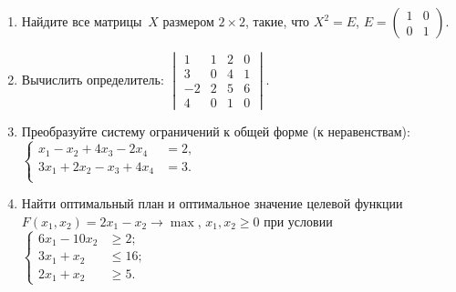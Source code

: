 \documentclass[a5paper,10pt]{extarticle}
\begin{document}
\begin{enumerate}
\item 
	Найдите все матрицы~$X$ размером $2\times 2$, такие, что 
	$X^2=E$,\quad 
	$E=\begin{pmatrix}
		1 & 0\\
		0 & 1
	\end{pmatrix}.
	$	
	\item Вычислить определитель: 
		$\begin{vmatrix}
				1  & 1  & 2  & 0  \\
				3  & 0  & 4  & 1  \\
			 -2  & 2  & 5  & 6  \\
				4  & 0  & 1  & 0
			\end{vmatrix}$.


\item Преобразуйте систему ограничений к общей форме (к неравенствам): 
$
\left\lbrace
\begin{aligned}
  x_1-x_2+4x_3-2x_4&=2,\\
  3x_1+2x_2-x_3+4x_4&=3.\\
\end{aligned}
\right.
$

  \item Найти оптимальный план и оптимальное значение целевой функции
		$F(x_{1},x_{2})=2x_{1}-x_{2} \to \max$, $x_{1},x_{2}\geqslant 0$
		при условии
 $
  \left\lbrace \begin{aligned}
    6x_{1}-10x_{2}	 &\geqslant	2;\\
    3x_{1}+	x_{2}	&\leqslant 16;\\
    2x_{1}	+x_{2} &\geqslant	5.
  \end{aligned} \right.
 $  

 
\end{enumerate}
\end{document}
